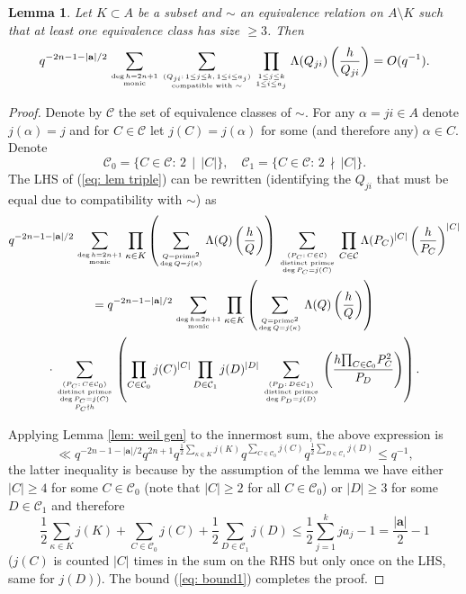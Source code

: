 \documentclass[alphabetic, 
        colorlinks,
        linkcolor=red,  citecolor=blue,
        backref
]{amsart}
\numberwithin{equation}{section}
\newtheorem{lem}[claim]{Lemma}
\theoremstyle{definition}
\begin{document}
\begin{lem}\label{lem_sums_in_inclusion_exclusion} Let $K\subset A$ be a subset and $\sim$ an equivalence relation on $A\setminus K$ such that at least one equivalence class has size $\ge 3$. Then
\begin{equation}\label{eq: lem triple}q^{-2n-1-|\mathbf a|/2}\sum_{\deg h=2n+1\atop{\text{monic}}}\sum_{(Q_{ji}:\,1\le j\le k,\,1\le i\le a_j)\atop{\text{compatible with $\sim$}}}\prod_{1\le j\le k\atop{1\le i\le a_j}}\Lambda(Q_{ji})\left(\frac h{Q_{ji}}\right)=O(q^{-1}).\end{equation}
\end{lem}

\begin{proof} Denote by $\mathcal C$ the set of equivalence classes of $\sim$. For any $\alpha=ji\in A$ denote $j(\alpha)=j$ and for $C\in\mathcal C$ let $j(C)=j(\alpha)$ for some (and therefore any) $\alpha\in C$. Denote
$$\mathcal C_0=\{C\in\mathcal C:\,2\,\mid\,|C|\},\quad \mathcal C_1=\{C\in\mathcal C:\,2\,\nmid\,|C|\}.$$ The LHS of (\ref{eq: lem triple}) can be rewritten (identifying the $Q_{ji}$ that must be equal due to compatibility with $\sim$) as
\begin{multline*}q^{-2n-1-|\mathbf a|/2}\sum_{\deg h=2n+1\atop{\text{monic}}}\prod_{\kappa\in K}\left(\sum_{Q=\text{prime}^2\atop{\deg Q=j(\kappa)}}\Lambda(Q)\left(\frac h{Q}\right)\right)\sum_{(P_C:\,C\in\mathcal C)\atop{\text{distinct primes}\atop{\deg P_C=j(C)}}}\prod_{C\in\mathcal C}\Lambda(P_C)^{|C|}\left(\frac h{P_C}\right)^{|C|}
\\
=q^{-2n-1-|\mathbf a|/2}\sum_{\deg h=2n+1\atop{\text{monic}}}\prod_{\kappa\in K}\left(\sum_{Q=\text{prime}^2\atop{\deg Q=j(\kappa)}}\Lambda(Q)\left(\frac h{Q}\right)\right)
\\
\cdot\sum_{(P_C:\,C\in\mathcal C_0)\atop{\text{distinct primes}\atop{\deg P_C=j(C)\atop{P_C\nmid h}}}}\left(\prod_{C\in\mathcal C_0}j(C)^{|C|}\prod_{D\in\mathcal C_1}j(D)^{|D|}
\sum_{(P_D:\,D\in\mathcal C_1)\atop{\text{distinct primes}\atop{\deg P_D=j(D)}}}\left(\frac{h{\prod_{C\in\mathcal C_0}}P_C^2}{P_D}\right)\right).
\end{multline*}

Applying Lemma \ref{lem: weil gen} to the innermost sum, the above expression is
\begin{equation}\label{eq: bound1}\ll q^{-2n-1-|\mathbf a|/2}q^{2n+1}q^{\frac 12\sum_{\kappa\in K}j(K)}q^{\sum_{C\in\mathcal C_0}j(C)}q^{\frac 12\sum_{D\in\mathcal C_1}j(D)}\le q^{-1},\end{equation}
the latter inequality is because by the assumption of the lemma we have either $|C|\ge 4$ for some $C\in\mathcal C_0$ (note that $|C|\ge 2$ for all $C\in\mathcal C_0$) or $|D|\ge 3$ for some $D\in\mathcal C_1$ and therefore $$\frac 12\sum_{\kappa\in K}j(K)+\sum_{C\in\mathcal C_0}j(C)+\frac 12\sum_{D\in\mathcal C_1}j(D)\le\frac 12\sum_{j=1}^kja_j-1 =\frac{|\mathbf a|}2-1$$
($j(C)$ is counted $|C|$ times in the sum on the RHS but only once on the LHS, same for $j(D)$). The bound (\ref{eq: bound1}) completes the proof.

\end{proof}
\end{document}
